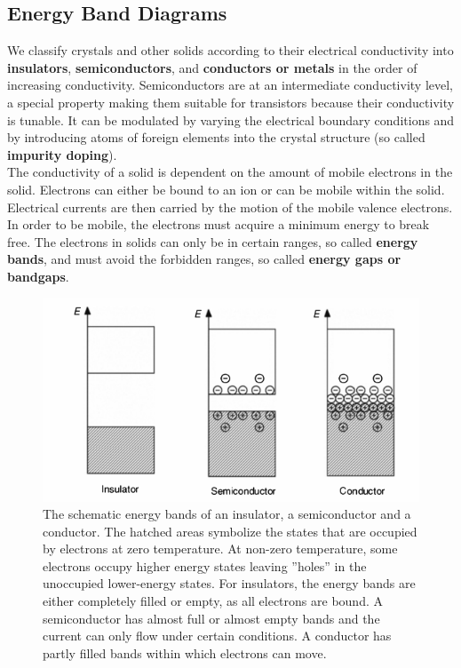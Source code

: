 \documentclass[report]{subfiles}
\begin{document}
\subsection{Energy Band Diagrams}
We classify crystals and other solids according to their electrical conductivity into \textbf{insulators}, \textbf{semiconductors}, and \textbf{conductors or metals} in the order of increasing conductivity. Semiconductors are at an intermediate conductivity level, a special property making them suitable for transistors because their conductivity is tunable. It can be modulated by varying the electrical boundary conditions and by introducing atoms of foreign elements into the crystal structure (so called \textbf{impurity doping}).\\
The conductivity of a solid is dependent on the amount of mobile electrons in the solid. Electrons can either be bound to an ion or can be mobile within the solid. Electrical currents are then carried by the motion of the mobile valence electrons. In order to be mobile, the electrons must acquire a minimum energy to break free. The electrons in solids can only be in certain ranges, so called \textbf{energy bands}, and must avoid the forbidden ranges, so called \textbf{energy gaps or bandgaps}.

\begin{figure}[H]
\centering
\includegraphics[scale=0.5]{pics/energybands.png}
\caption{The schematic energy bands of an insulator, a semiconductor and a conductor. The hatched areas symbolize the states that are occupied by electrons at zero temperature. At non-zero temperature, some electrons occupy higher energy states leaving ''holes'' in the unoccupied lower-energy states. For insulators, the energy bands are either completely filled or empty, as all electrons are bound. A semiconductor has almost full or almost empty bands and the current can only flow under certain conditions. A conductor has partly filled bands within which electrons can move. }
\end{figure}
\end{document}
